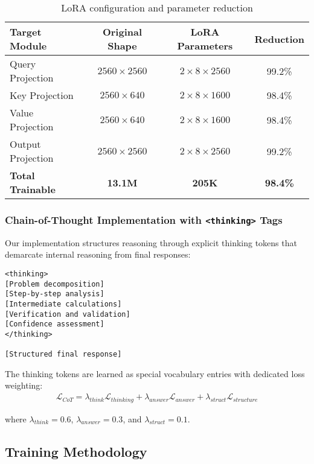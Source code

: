 \begin{table}[H]
\centering
\begin{tabular}{lccc}
\toprule
Target Module & Original Shape & LoRA Parameters & Reduction \\
\midrule
Query Projection & $2560 \times 2560$ & $2 \times 8 \times 2560$ & 99.2\% \\
Key Projection & $2560 \times 640$ & $2 \times 8 \times 1600$ & 98.4\% \\
Value Projection & $2560 \times 640$ & $2 \times 8 \times 1600$ & 98.4\% \\
Output Projection & $2560 \times 2560$ & $2 \times 8 \times 2560$ & 99.2\% \\
\midrule
\textbf{Total Trainable} & \textbf{13.1M} & \textbf{205K} & \textbf{98.4\%} \\
\bottomrule
\end{tabular}
\caption{LoRA configuration and parameter reduction}
\label{tab:lora-config}
\end{table}

\subsubsection{Chain-of-Thought Implementation with \texttt{<thinking>} Tags}
Our implementation structures reasoning through explicit thinking tokens that demarcate internal reasoning from final responses:

\begin{lstlisting}[caption=Chain-of-thought structure,label=lst:cot-structure]
<thinking>
[Problem decomposition]
[Step-by-step analysis]
[Intermediate calculations]
[Verification and validation]
[Confidence assessment]
</thinking>

[Structured final response]
\end{lstlisting}

The thinking tokens are learned as special vocabulary entries with dedicated loss weighting:
\begin{align}
\mathcal{L}_{CoT} = \lambda_{think} \mathcal{L}_{thinking} + \lambda_{answer} \mathcal{L}_{answer} + \lambda_{struct} \mathcal{L}_{structure}
\end{align}

where $\lambda_{think} = 0.6$, $\lambda_{answer} = 0.3$, and $\lambda_{struct} = 0.1$.

\subsection{Training Methodology}

